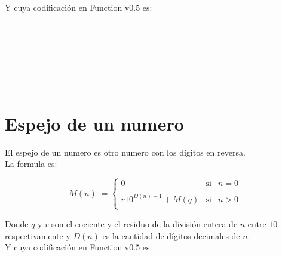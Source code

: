       Y cuya codificación en Function v0.5 es:
      
      \begin{fxcode}
         \\
         \\
      \end{fxcode}
      
      \begin{fxcode}
         \\
         \\
         \\
      \end{fxcode}
      
   \section{Espejo de un numero}
      El espejo de un numero es otro numero con los dígitos en reversa.
      \\
      
      La formula es:
      
      \[M(n) := \left\{ \begin{array}{rcl}
            0 & \mbox{si} & n = 0\\
            & & \\
            r10^{D(n) - 1} + M(q) &  \mbox{si} & n > 0\\
         \end{array}
      \right. \]
      
      Donde $q$ y $r$ son el cociente y el residuo de la división entera de $n$ entre $10$ respectivamente y $D(n)$ es la cantidad de dígitos decimales de $n$.
      \\
      
      Y cuya codificación en Function v0.5 es:
      
      \begin{fxcode}
         \\
         \\
         \\
      \end{fxcode}
      

